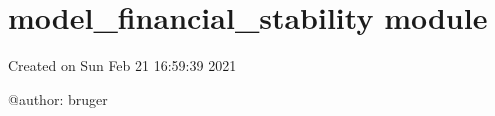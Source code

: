 \documentclass[letterpaper,10pt,english]{sphinxmanual}
\begin{document}
\sphinxstepscope


\section{model\_financial\_stability module}
\label{\detokenize{unsorted/model_financial_stability:module-model_financial_stability}}\label{\detokenize{unsorted/model_financial_stability:model-financial-stability-module}}\label{\detokenize{unsorted/model_financial_stability::doc}}
\sphinxAtStartPar
Created on Sun Feb 21 16:59:39 2021

\sphinxAtStartPar
@author: bruger
\end{document}
